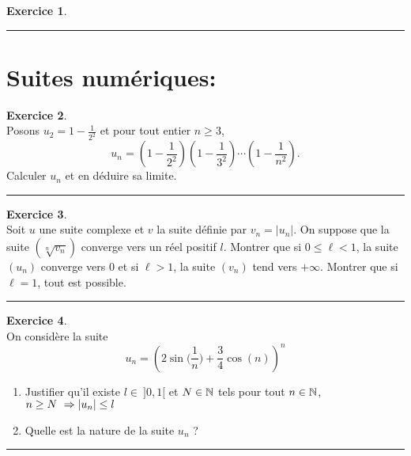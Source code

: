 \documentclass[a4paper,11pt]{article}
\theoremstyle{definition}
\newtheorem{exo}{Exercice} %
\begin{document}
\begin{minipage}{1\linewidth}
\begin{minipage}[t]{0.48\linewidth}
\begin{exo}
			\centering
			\rule{1\linewidth}{0.6pt}
		\end{exo}
		
	
		
	\end{minipage}	
	\hfill\vrule\hfill
	\begin{minipage}[t]{0.48\linewidth}
		\raggedright
	\section*{Suites numériques:}%
	\begin{exo}\textit{}\quad\\[0.25cm]
	Posons $  u_2=1-\frac{1}{2^2}$ et pour tout entier $n\geq 3$,
	\[
	u_n=\left(1-\frac{1}{2^2}\right)\left(1-\frac{1}{3^2}\right)\cdots\left(1-\frac{1}{n^2}\right).\]
	Calculer $u_n$ et en déduire sa limite. %
		
		
		\centering
		\rule{1\linewidth}{0.6pt}
	\end{exo}
	
	
	
	\begin{exo}\textit{}\quad\\
	Soit $u$ une suite complexe et $v$ la suite définie par $v_n=|u_n|$. On suppose que la suite $(\sqrt[n]{v_n})$ converge vers un réel positif $l$. Montrer que si $0\leq\ell<1$, la suite $(u_n)$ converge vers $0$ et si $\ell>1$, la suite $(v_n)$ tend vers $+\infty$.
	Montrer que si $\ell=1$, tout est possible.
		
		\centering
		\rule{1\linewidth}{0.6pt}
	\end{exo}
	
	\begin{exo}\quad\\
		On considère la suite $$u_n=\left(2\sin\big(\dfrac{1}{n}\big)+\dfrac{3}{4}\cos(n)\right)^n$$
		\begin{enumerate}
			\item Justifier qu'il existe $l\in \ ]0,1[$ et $N\in\mathbb{N}$
			tels pour tout $n\in\mathbb{N}$,\
			 $n\geq N \ \Large\Rightarrow |u_n|\leq l$
			\item Quelle est la nature de la suite $u_n$ ?
		\end{enumerate}
		
		\centering
		\rule{1\linewidth}{0.6pt}
	\end{exo}
		
		
		
		
	\end{minipage}
\end{minipage}



		
	
		
		
\end{document}

